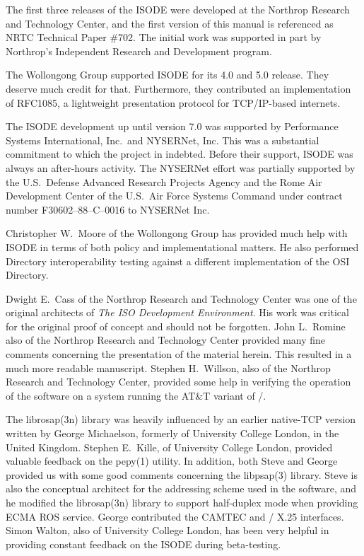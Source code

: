 The first three releases of the ISODE were developed at the Northrop
Research and Technology Center,
and the first version of this manual is referenced as NRTC Technical
Paper \#702.
The initial work was supported in part by Northrop's Independent
Research and Development program.

The Wollongong Group supported ISODE for its 4.0 and 5.0 release.
They deserve much credit for that.
Furthermore,
they contributed an implementation of RFC1085,
a lightweight presentation protocol for TCP/IP-based internets.

The ISODE development up until version 7.0 was 
supported by Performance Systems International,
Inc.~and \mbox{NYSERNet}, Inc.
This was a 
substantial commitment to which the project in indebted.
Before their support, ISODE was always an after-hours activity.
The \mbox{NYSERNet} effort was partially supported by the U.S.~Defense Advanced Research
Projects Agency and the Rome Air Development Center of the U.S.~Air Force
Systems Command under contract number F30602--88--C--0016 to NYSERNet Inc.

Christopher W.~Moore
of the Wollongong Group has provided much help with ISODE in terms of both
policy and implementational matters.
He also performed Directory interoperability testing against a different
implementation of the OSI Directory.

Dwight E.~Cass
of the Northrop Research and Technology Center was one of the original
architects of {\em The ISO Development Environment}.
His work was critical for the original proof of concept and should not be
forgotten.
John L.~Romine
also of the Northrop Research and Technology Center provided many
fine comments concerning the presentation of the material herein.
This resulted in a much more readable manuscript.
Stephen H.~Willson,
also of the Northrop Research and Technology Center,
provided some help in verifying the operation of the
software on a system running the AT\&T variant of \unix/.

The \man librosap(3n) library was heavily influenced by an earlier native-TCP
version written by George Michaelson,
formerly of University College London, in
the United Kingdom.
Stephen E.~Kille,
of University College London,
provided valuable feedback on the \man pepy(1) utility.
In addition,
both Steve and George provided us with some good comments concerning the
\man libpsap(3) library.
Steve is also the conceptual architect for the addressing scheme used in
the software,
and he modified the \man librosap(3n) library to support half-duplex mode when
providing ECMA ROS service.
George contributed the CAMTEC and \ultrix/ X.25 interfaces.
Simon Walton,
also of University College London,
has been very helpful in providing constant feedback on the ISODE during
beta-testing.

